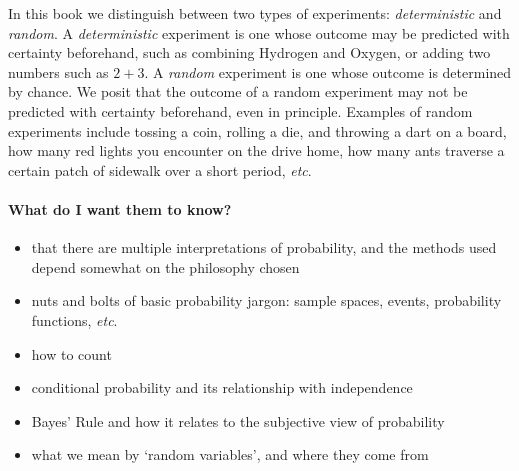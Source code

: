 \documentclass[captions=tableheading]{scrbook}
\begin{document}
In this book we distinguish between two types of experiments: \emph{deterministic} and \emph{random}. A \emph{deterministic} experiment is one whose outcome may be predicted with certainty beforehand, such as combining Hydrogen and Oxygen, or adding two numbers such as \(2+3\). A \emph{random} experiment is one whose outcome is determined by chance. We posit that the outcome of a random experiment may not be predicted with certainty beforehand, even in principle. Examples of random experiments include tossing a coin, rolling a die, and throwing a dart on a board, how many red lights you encounter on the drive home, how many ants traverse a certain patch of sidewalk over a short period, \emph{etc}.

\paragraph*{What do I want them to know?}

\begin{itemize}
\item that there are multiple interpretations of probability, and the methods used depend somewhat on the philosophy chosen
\item nuts and bolts of basic probability jargon: sample spaces, events, probability functions, \emph{etc}.
\item how to count
\item conditional probability and its relationship with independence
\item Bayes' Rule and how it relates to the subjective view of probability
\item what we mean by `random variables', and where they come from
\end{itemize}
\end{document}
